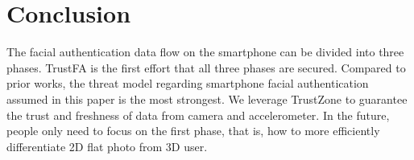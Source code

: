\section{Conclusion}
\label{sec:conclusion}

The facial authentication data flow on the smartphone can be divided into three
phases. TrustFA is the first effort that all three phases are secured.
Compared to prior works, the threat model regarding smartphone facial
authentication assumed in this paper is the most strongest. We leverage
TrustZone to guarantee the trust and freshness of data from camera and
accelerometer. In the future, people only need to focus on the first phase,
that is, how to more efficiently differentiate 2D flat photo from 3D user.

